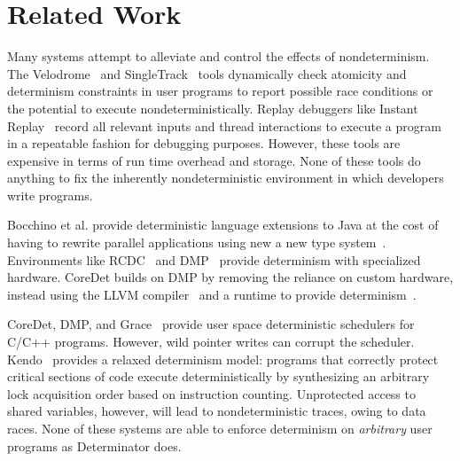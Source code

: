 
\section{Related Work}

Many systems attempt to alleviate and control the effects of nondeterminism.
The Velodrome~\cite{flanagan2008velodrome} and
SingleTrack~\cite{sadowski2009singletrack} tools dynamically check atomicity and
determinism constraints in user programs to report possible race conditions or
the potential to execute nondeterministically. Replay debuggers like Instant
Replay~\cite{leblanc1987debugging} record all relevant inputs and thread
interactions to execute a program in a repeatable fashion for debugging
purposes. However, these tools are expensive in terms of run time overhead and
storage. None of these tools do anything to fix the inherently
nondeterministic environment in which developers write programs.

Bocchino et al. provide deterministic language extensions to Java at the cost
of having to rewrite parallel applications using new a new type
system~\cite{bocchino2009type}. Environments like RCDC~\cite{devietti2011rcdc}
and DMP~\cite{Devietti09} provide determinism with specialized hardware.
CoreDet builds on DMP by removing the reliance on custom hardware, instead using
the LLVM compiler~\cite{lattner2004llvm} and a runtime to provide
determinism~\cite{bergan2010coredet}.

CoreDet, DMP, and Grace~\cite{berger2009grace} provide user space deterministic
schedulers for C/C++ programs. However, wild pointer writes can corrupt the
scheduler. Kendo~\cite{olszewski2009kendo} provides a relaxed determinism model:
programs that correctly protect critical sections of code execute
deterministically by synthesizing an arbitrary lock acquisition order based on
instruction counting. Unprotected access to shared variables, however, will lead
to nondeterministic traces, owing to data races. None of these systems are able
to enforce determinism on \emph{arbitrary} user programs as Determinator does.

\endinput


